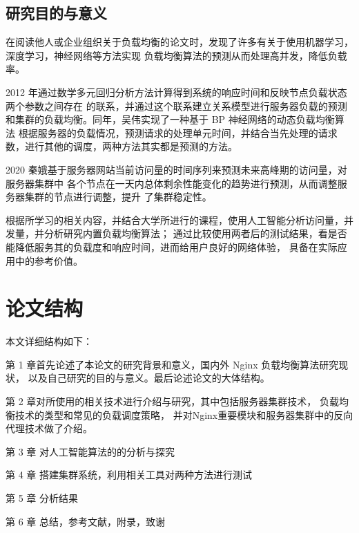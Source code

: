 \subsection{研究目的与意义}

在阅读他人或企业组织关于负载均衡的论文时，发现了许多有关于使用机器学习，深度学习，神经网络等方法实现
负载均衡算法的预测从而处理高并发，降低负载率。

2012 年通过数学多元回归分析方法计算得到系统的响应时间和反映节点负载状态两个参数之间存在
的联系，并通过这个联系建立关系模型进行服务器负载的预测和集群的负载均衡。同年，吴伟实现了一种基于 BP 神经网络的动态负载均衡算法
根据服务器的负载情况，预测请求的处理单元时间，并结合当先处理的请求数，进行其他的调度，两种方法其实都是预测的方法。

2020 秦娥基于服务器网站当前访问量的时间序列来预测未来高峰期的访问量\cite{qbee}，对服务器集群中
各个节点在一天内总体剩余性能变化的趋势进行预测，从而调整服务器集群的节点进行调整，提升
了集群稳定性。

根据所学习的相关内容，并结合大学所进行的课程，使用人工智能分析访问量，并发量，并分析研究内置负载均衡算法；
通过比较使用两者后的测试结果，看是否能降低服务其的负载度和响应时间，进而给用户良好的网络体验，
具备在实际应用中的参考价值。

\section{论文结构}

本文详细结构如下：

第 1 章首先论述了本论文的研究背景和意义，国内外 Nginx 负载均衡算法研究现状，
以及自己研究的目的与意义。最后论述论文的大体结构。

第 2 章对所使用的相关技术进行介绍与研究，其中包括服务器集群技术，
负载均衡技术的类型和常见的负载调度策略，
并对Nginx重要模块和服务器集群中的反向代理技术做了介绍。

第 3 章 对人工智能算法的的分析与探究

第 4 章 搭建集群系统，利用相关工具对两种方法进行测试

第 5 章 分析结果

第 6 章 总结，参考文献，附录，致谢
